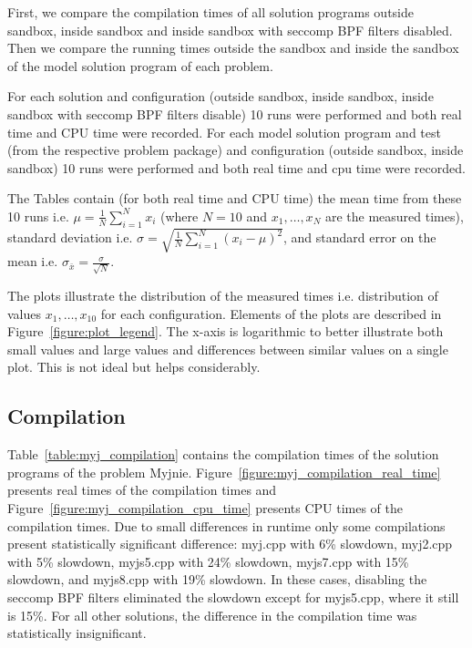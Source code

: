 \documentclass[en]{pracamgr}
\begin{document}
First, we compare the compilation times of all solution programs outside sandbox, inside sandbox and inside sandbox with seccomp BPF filters disabled. Then we compare the running times outside the sandbox and inside the sandbox of the model solution program of each problem.

For each solution and configuration (outside sandbox, inside sandbox, inside sandbox with seccomp BPF filters disable) 10 runs were performed and both real time and CPU time were recorded. For each model solution program and test (from the respective problem package) and configuration (outside sandbox, inside sandbox) 10 runs were performed and both real time and cpu time were recorded.

The Tables contain (for both real time and CPU time) the mean time from these 10 runs i.e. $\mu = \frac{1}{N} \sum_{i=1}^N x_i$ (where $N = 10$ and $x_1, \ldots, x_N$ are the measured times), standard deviation i.e. $\sigma = \sqrt{\frac{1}{N} \sum_{i=1}^N (x_i - \mu)^2}$, and standard error on the mean i.e. $\sigma_{\bar{x}} = \frac{\sigma}{\sqrt{N}}$.

The plots illustrate the distribution of the measured times i.e. distribution of values $x_1, \ldots, x_{10}$ for each configuration. Elements of the plots are described in Figure~\ref{figure:plot_legend}. The x-axis is logarithmic to better illustrate both small values and large values and differences between similar values on a single plot. This is not ideal but helps considerably.

\subsection{Compilation}

Table~\ref{table:myj_compilation} contains the compilation times of the solution programs of the problem Myjnie. Figure~\ref{figure:myj_compilation_real_time} presents real times of the compilation times and Figure~\ref{figure:myj_compilation_cpu_time} presents CPU times of the compilation times. Due to small differences in runtime only some compilations present statistically significant difference: myj.cpp with 6\% slowdown, myj2.cpp with 5\% slowdown, myjs5.cpp with 24\% slowdown, myjs7.cpp with 15\% slowdown, and myjs8.cpp with 19\% slowdown. In these cases, disabling the seccomp BPF filters eliminated the slowdown except for myjs5.cpp, where it still is 15\%. For all other solutions, the difference in the compilation time was statistically insignificant.
\end{document}
